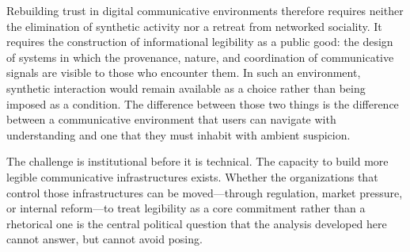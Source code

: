 \documentclass[12pt, a4paper]{article}
\begin{document}
Rebuilding trust in digital communicative environments therefore requires neither the elimination of synthetic activity nor a retreat from networked sociality. It requires the construction of informational legibility as a public good: the design of systems in which the provenance, nature, and coordination of communicative signals are visible to those who encounter them. In such an environment, synthetic interaction would remain available as a choice rather than being imposed as a condition. The difference between those two things is the difference between a communicative environment that users can navigate with understanding and one that they must inhabit with ambient suspicion.

The challenge is institutional before it is technical. The capacity to build more legible communicative infrastructures exists. Whether the organizations that control those infrastructures can be moved---through regulation, market pressure, or internal reform---to treat legibility as a core commitment rather than a rhetorical one is the central political question that the analysis developed here cannot answer, but cannot avoid posing.
\end{document}
